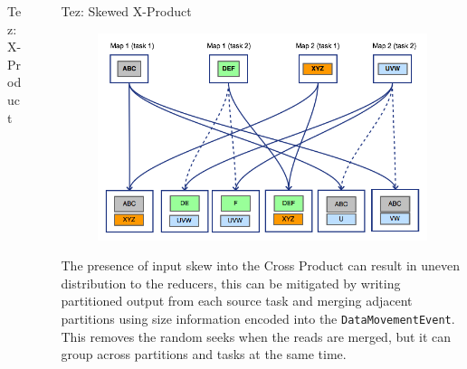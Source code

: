 \documentclass[final]{beamer}
\newlength{\sepwid}
\newlength{\onecolwid}
\newlength{\twocolwid}
\begin{document}
\begin{frame}[t]
\begin{columns}[t]
\begin{column}{\twocolwid}
\begin{columns}[t,totalwidth=\twocolwid]
\begin{column}{\onecolwid}
\begin{block}{Tez: X-Product}
\end{block}



\end{column} %

\end{columns} %

\end{column} %

\begin{column}{\sepwid}\end{column} %

\begin{column}{\onecolwid} %


\begin{block}{Tez: Skewed X-Product}

\begin{figure}
\includegraphics{figures/Tez-XProd-2.png}
\end{figure}

The presence of input skew into the Cross Product can result in uneven distribution to the reducers, this can be
mitigated by writing partitioned output from each source task and merging adjacent partitions using size information
encoded into the \texttt{DataMovementEvent}. This removes the random seeks when the reads are merged, but it can group
across partitions and tasks at the same time.


\end{block}
\end{column}
\end{columns}
\end{frame}
\end{document}
